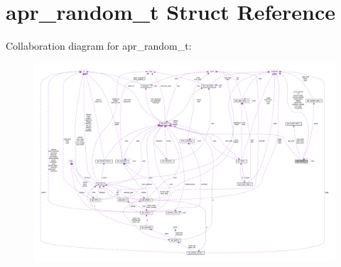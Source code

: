 \hypertarget{structapr__random__t}{}\section{apr\+\_\+random\+\_\+t Struct Reference}
\label{structapr__random__t}


Collaboration diagram for apr\+\_\+random\+\_\+t\+:
\nopagebreak
\begin{figure}[H]
\begin{center}
\leavevmode
\includegraphics[width=350pt]{structapr__random__t__coll__graph}
\end{center}
\end{figure}
